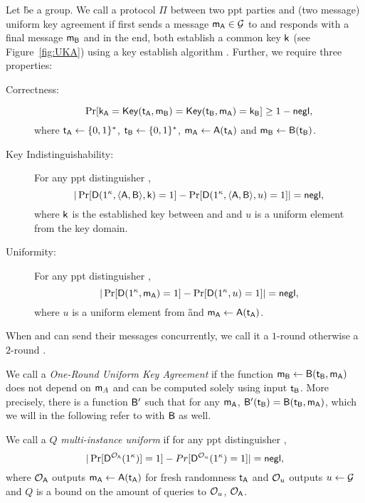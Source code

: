 \begin{definition} 
Let \G be a group.
We call a protocol $\Pi$ between two ppt parties \A and \B (two message) uniform key agreement if \A first sends a message $\mathsf{m}_\mathsf{A}\in\mathcal{G}$ to \B and \B responds with a final message $\mathsf{m}_\mathsf{B}$ and in the end, both establish a common key $\mathsf{k}$ (see Figure~\ref{fig:UKA}) using a key establish algorithm \EK. Further, we require three properties:
\begin{description}
\item[Correctness:]
$$
\Pr[\mathsf{k}_\mathsf{A}=\mathsf{Key}(\mathsf{t}_\mathsf{A},\mathsf{m}_\mathsf{B})=\mathsf{Key}(\mathsf{t}_\mathsf{B},\mathsf{m}_\mathsf{A})=\mathsf{k}_\mathsf{B}]\geq 1-\mathsf{negl},
$$
where $\mathsf{t}_\mathsf{A}\leftarrow\{0,1\}^*$, $\mathsf{t}_\mathsf{B}\leftarrow\{0,1\}^*$, $\mathsf{m}_\mathsf{A}\leftarrow\mathsf{A}(\mathsf{t}_\mathsf{A})$ and $\mathsf{m}_\mathsf{B}\leftarrow\mathsf{B}(\mathsf{t}_\mathsf{B})$.
\item [Key Indistinguishability:] For any ppt distinguisher \D,
$$ 
|\Pr[\mathsf D(1^\kappa,\langle \mathsf{A},\mathsf{B}\rangle, \mathsf{k})=1]-\Pr[\mathsf D(1^\kappa,\langle \mathsf{A},\mathsf{B}\rangle, u)=1]|=\mathsf{negl},
$$
where $\mathsf{k}$ is the established key between \A and \B and $u$ is a uniform element from the key domain.
\item [Uniformity:] For any ppt distinguisher \D, 
$$
|\Pr[\mathsf D(1^\kappa,\mathsf{m}_\mathsf{A})=1]-\Pr[\mathsf D( 1^\kappa,u)=1]|=\mathsf{negl},
$$
where $u$ is a uniform element from \G and $\mathsf{m}_\mathsf{A}\leftarrow\mathsf{A}(\mathsf{t}_\mathsf{A})$.
\end{description}
When \A and \B can send their messages concurrently, we call it a $1$-round \UKA otherwise a $2$-round \UKA.
\end{definition}

\begin{definition}
We call a \UKA \emph{One-Round Uniform Key Agreement} if the function $\mathsf{m}_{\mathsf{B}}\leftarrow\mathsf{B}(\mathsf{t}_{\mathsf{B}},\mathsf{m}_\mathsf{A})$ does not depend on $\mathsf{m}_A$ and can be computed solely using input $\mathsf{t}_{\mathsf{B}}$. More precisely, there is a function $\mathsf{B}'$ such that for any $\mathsf{m}_{\mathsf{A}}$, $\mathsf{B}'(\mathsf{t}_{\mathsf{B}})=\mathsf{B}(\mathsf{t}_{\mathsf{B}},\mathsf{m}_{\mathsf{A}})$, which we will in the following refer to with $\mathsf{B}$ as well. 
\end{definition}

\begin{definition}
We call a \UKA $Q$ \emph{multi-instance uniform} if for any ppt distinguisher \D,
$$
|\Pr[\mathsf D^{\mathcal{O}_{\mathsf{A}}}(1^{\kappa})]=1]-Pr[\mathsf D^{\mathcal{O}_{u}}(1^{\kappa})=1]|=\mathsf{negl},
$$
where $\mathcal{O}_{\mathsf{A}}$ outputs $\mathsf{m}_\mathsf{A}\leftarrow\mathsf{A}(\mathsf{t}_\mathsf{A})$ for fresh randomness $\mathsf{t}_\mathsf{A}$ and $\mathcal{O}_u$ outputs $u\leftarrow\mathcal{G}$ and $Q$ is a bound on the amount of queries to $\mathcal{O}_{u}$, $\mathcal{O}_{\mathsf{A}}$.
\end{definition}



